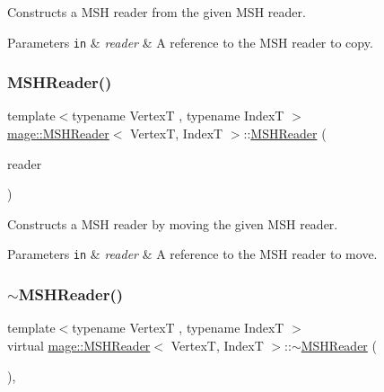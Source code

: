 Constructs a M\+SH reader from the given M\+SH reader.


\begin{DoxyParams}[1]{Parameters}
\mbox{\tt in}  & {\em reader} & A reference to the M\+SH reader to copy. \\
\hline
\end{DoxyParams}
\hypertarget{classmage_1_1_m_s_h_reader_a78e8751423b659aea0b2d91d281fa5fa}{}\label{classmage_1_1_m_s_h_reader_a78e8751423b659aea0b2d91d281fa5fa} 
\subsubsection{\texorpdfstring{M\+S\+H\+Reader()}{MSHReader()}\hspace{0.1cm}{\footnotesize\ttfamily [3/3]}}
{\footnotesize\ttfamily template$<$typename VertexT , typename IndexT $>$ \\
\hyperlink{classmage_1_1_m_s_h_reader}{mage\+::\+M\+S\+H\+Reader}$<$ VertexT, IndexT $>$\+::\hyperlink{classmage_1_1_m_s_h_reader}{M\+S\+H\+Reader} (\begin{DoxyParamCaption}\item[{\hyperlink{classmage_1_1_m_s_h_reader}{M\+S\+H\+Reader}$<$ VertexT, IndexT $>$ \&\&}]{reader }\end{DoxyParamCaption})\hspace{0.3cm}{\ttfamily [delete]}}

Constructs a M\+SH reader by moving the given M\+SH reader.


\begin{DoxyParams}[1]{Parameters}
\mbox{\tt in}  & {\em reader} & A reference to the M\+SH reader to move. \\
\hline
\end{DoxyParams}
\hypertarget{classmage_1_1_m_s_h_reader_aca7a192cd593d38167b5c284a0555932}{}\label{classmage_1_1_m_s_h_reader_aca7a192cd593d38167b5c284a0555932} 
\subsubsection{\texorpdfstring{$\sim$\+M\+S\+H\+Reader()}{~MSHReader()}}
{\footnotesize\ttfamily template$<$typename VertexT , typename IndexT $>$ \\
virtual \hyperlink{classmage_1_1_m_s_h_reader}{mage\+::\+M\+S\+H\+Reader}$<$ VertexT, IndexT $>$\+::$\sim$\hyperlink{classmage_1_1_m_s_h_reader}{M\+S\+H\+Reader} (\begin{DoxyParamCaption}{ }\end{DoxyParamCaption})\hspace{0.3cm}{\ttfamily [virtual]}, {\ttfamily [default]}}

